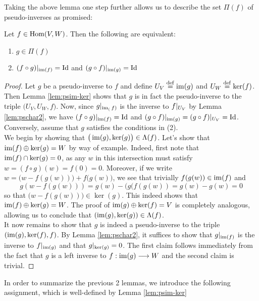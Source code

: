 \documentclass{dsp}
\begin{document}
Taking the above lemma one step further allows us to describe the set $\Pi(f)$ of pseudo-inverses as promised:

\begin{lemma}\label{lem:charpi}
	Let $f \in \operatorname{Hom}(V,W)$. Then the following are equivalent:
	\begin{enumerate}
	\item $g \in \Pi(f)$
	\item $(f\circ g)\arrowvert_{\operatorname{im}(f)}=\operatorname{Id}$ and $(g\circ f)\arrowvert_{\operatorname{im}(g)}=\operatorname{Id}$ 
	\end{enumerate}
\end{lemma}

\begin{proof}
	Let $g$ be a pseudo-inverse to $f$ and define $U_V\stackrel{\operatorname{def}}{=}\operatorname{im}(g)$ and $U_W\stackrel{\operatorname{def}}{=}\ker(f)$. Then Lemma \ref{lem:psim-ker} shows that $g$ is in fact the pseudo-inverse to the triple $\big(U_V,U_W,f\big)$. Now, since $g\arrowvert_{\operatorname{im}_(f)}$ is the inverse to $f\arrowvert_{U_V}$ by Lemma \ref{lem:pschar2}, we have $(f \circ g)\arrowvert_{\operatorname{im}(f)}=\operatorname{Id}$ and $(g \circ f)\arrowvert_{\operatorname{im}(g)}=(g \circ f)\arrowvert_{U_V}=\operatorname{Id}$.\\
	Conversely, assume that $g$ satisfies the conditions in (2).\\
	We begin by showing that $\big(\operatorname{im}(g),\ker(g)\big) \in \Lambda(f)$. Let's show  that $\operatorname{im}(f)\oplus \ker(g)=W$ by way of example. Indeed, first note that $\operatorname{im}(f)\cap \ker(g)=0$, as any $w$ in this intersection must satisfy $w=(f\circ g)(w)=f(0)=0$. Moreover, if we write $w=\big(w-f( g(w))\big)+f ( g(w)\big)$, we see that trivially $f(g(w))\in \operatorname{im} (f)$ and \[
	g(w-f(g(w)))=g(w)-(g(f(g(w))=g(w)-g(w)=0
	\]
	so that $\big(w-f(g(w))\big) \in \ker(g)$. This indeed shows that $\operatorname{im}(f)\oplus \ker(g)=W$. The proof of $\operatorname{im}(g)\oplus \ker(f)=V$ is completely analogous, allowing us to conclude that $(\operatorname{im}(g),\ker(g))\in \Lambda(f)$.\\
	It now remains to show that $g$ is indeed a pseudo-inverse to the triple $(\operatorname{im}(g),\ker(f),f)$. By Lemma \ref{lem:pschar2}, it suffices to show that $g\arrowvert_{\operatorname{im}(f)}$ is the inverse to $f\arrowvert_{\operatorname{im}(g)}$ and that $g\arrowvert_{\ker(g)}=0$. The first claim follows immediately from the fact that $g$ is a left inverse to $f:\operatorname{im}(g)\longrightarrow W$ and the second claim is trivial.
\end{proof}

\noindent In order to summarize the previous 2 lemmas, we introduce the following assignment, which is well-defined by Lemma \ref{lem:psim-ker}
\end{document}
